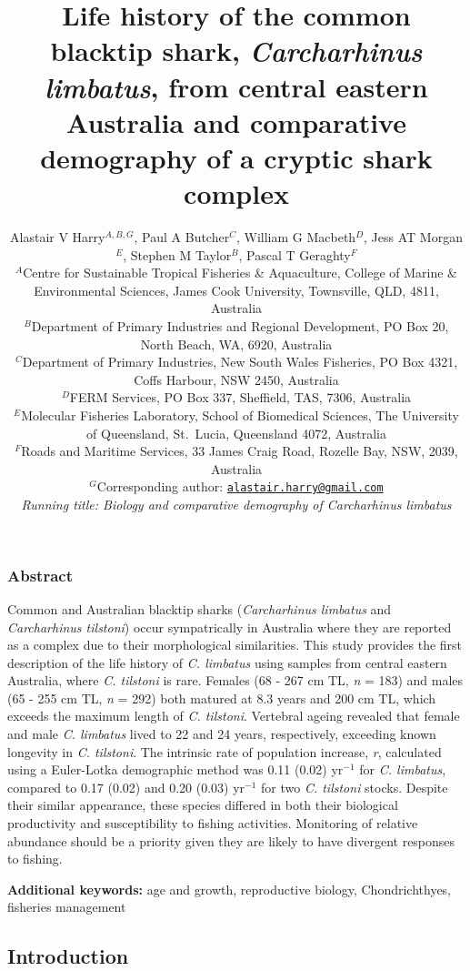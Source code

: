 \documentclass[]{article}
\title{Life history of the common blacktip shark, \emph{Carcharhinus limbatus},
from central eastern Australia and comparative demography of a cryptic
shark complex}
\author{Alastair V Harry\(^{A,B,G}\), Paul A Butcher\(^C\), William G
Macbeth\(^D\), Jess AT Morgan\(^E\), Stephen M Taylor\(^B\), Pascal T
Geraghty\(^F\)\\[2\baselineskip]\(^A\)Centre for Sustainable Tropical
Fisheries \& Aquaculture, College of Marine \& Environmental Sciences,
James Cook University, Townsville, QLD, 4811, Australia\\
\(^B\)Department of Primary Industries and Regional Development, PO Box
20, North Beach, WA, 6920, Australia\\
\(^C\)Department of Primary Industries, New South Wales Fisheries, PO
Box 4321, Coffs Harbour, NSW 2450, Australia\\
\(^D\)FERM Services, PO Box 337, Sheffield, TAS, 7306, Australia\\
\(^E\)Molecular Fisheries Laboratory, School of Biomedical Sciences, The
University of Queensland, St.~Lucia, Queensland 4072, Australia\\
\(^F\)Roads and Maritime Services, 33 James Craig Road, Rozelle Bay,
NSW, 2039, Australia\\
\(^G\)Corresponding author:
\href{mailto:alastair.harry@gmail.com}{\nolinkurl{alastair.harry@gmail.com}}\\
\emph{Running title: Biology and comparative demography of Carcharhinus
limbatus}}
\date{}
\begin{document}
\maketitle

\newpage

\subsubsection{Abstract}\label{abstract}

Common and Australian blacktip sharks (\emph{Carcharhinus limbatus} and
\emph{Carcharhinus tilstoni}) occur sympatrically in Australia where
they are reported as a complex due to their morphological similarities.
This study provides the first description of the life history of
\emph{C. limbatus} using samples from central eastern Australia, where
\emph{C. tilstoni} is rare. Females (68 - 267 cm TL, \emph{n} = 183) and
males (65 - 255 cm TL, \emph{n} = 292) both matured at 8.3 years and 200
cm TL, which exceeds the maximum length of \emph{C. tilstoni}. Vertebral
ageing revealed that female and male \emph{C. limbatus} lived to 22 and
24 years, respectively, exceeding known longevity in \emph{C. tilstoni}.
The intrinsic rate of population increase, \emph{r}, calculated using a
Euler-Lotka demographic method was 0.11 (0.02) yr\(^{-1}\) for \emph{C.
limbatus}, compared to 0.17 (0.02) and 0.20 (0.03) yr\(^{-1}\) for two
\emph{C. tilstoni} stocks. Despite their similar appearance, these
species differed in both their biological productivity and
susceptibility to fishing activities. Monitoring of relative abundance
should be a priority given they are likely to have divergent responses
to fishing.

\textbf{Additional keywords:} age and growth, reproductive biology,
Chondrichthyes, fisheries management

\newpage

\subsection{Introduction}\label{introduction}
\end{document}
